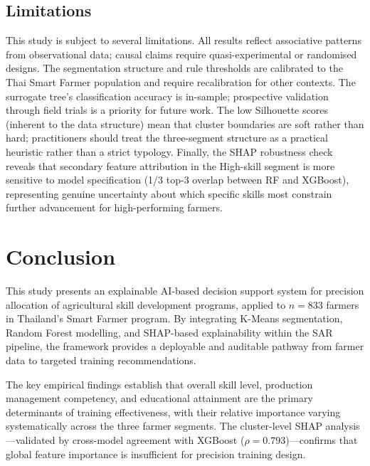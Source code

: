 \documentclass[3p,twocolumn,authoryear]{elsarticle}
\begin{document}
\subsection{Limitations}

This study is subject to several limitations.
All results reflect associative patterns from observational data; causal
claims require quasi-experimental or randomised designs.
The segmentation structure and rule thresholds are calibrated to the Thai
Smart Farmer population and require recalibration for other contexts.
The surrogate tree's classification accuracy is in-sample; prospective
validation through field trials is a priority for future work.
The low Silhouette scores (inherent to the data structure) mean that
cluster boundaries are soft rather than hard; practitioners should treat
the three-segment structure as a practical heuristic rather than a
strict typology.
Finally, the SHAP robustness check reveals that secondary feature
attribution in the High-skill segment is more sensitive to model
specification (1/3 top-3 overlap between RF and XGBoost), representing
genuine uncertainty about which specific skills most constrain further
advancement for high-performing farmers.

\section{Conclusion}

This study presents an explainable AI-based decision support system for
precision allocation of agricultural skill development programs, applied
to $n = 833$ farmers in Thailand's Smart Farmer program.
By integrating K-Means segmentation, Random Forest modelling, and
SHAP-based explainability within the SAR pipeline, the framework provides
a deployable and auditable pathway from farmer data to targeted training
recommendations.

The key empirical findings establish that overall skill level, production
management competency, and educational attainment are the primary
determinants of training effectiveness, with their relative importance
varying systematically across the three farmer segments.
The cluster-level SHAP analysis---validated by cross-model agreement with
XGBoost ($\rho = 0.793$)---confirms that global feature importance is
insufficient for precision training design.
\end{document}
